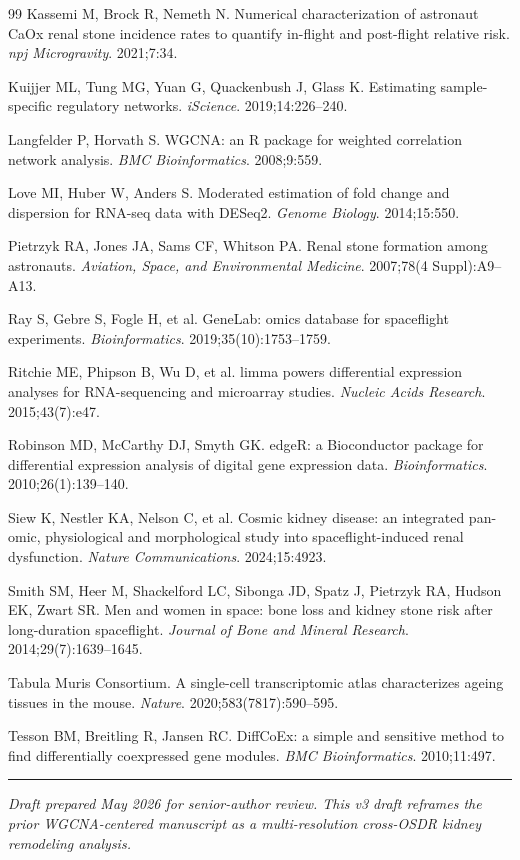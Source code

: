 \documentclass[11pt]{article}
\begin{document}
\begin{thebibliography}{99}
 Kassemi M, Brock R, Nemeth N. Numerical characterization of astronaut CaOx renal stone incidence rates to quantify in-flight and post-flight relative risk. \emph{npj Microgravity}. 2021;7:34.

 Kuijjer ML, Tung MG, Yuan G, Quackenbush J, Glass K. Estimating sample-specific regulatory networks. \emph{iScience}. 2019;14:226--240.

 Langfelder P, Horvath S. WGCNA: an R package for weighted correlation network analysis. \emph{BMC Bioinformatics}. 2008;9:559.

 Love MI, Huber W, Anders S. Moderated estimation of fold change and dispersion for RNA-seq data with DESeq2. \emph{Genome Biology}. 2014;15:550.

 Pietrzyk RA, Jones JA, Sams CF, Whitson PA. Renal stone formation among astronauts. \emph{Aviation, Space, and Environmental Medicine}. 2007;78(4 Suppl):A9--A13.

 Ray S, Gebre S, Fogle H, et al. GeneLab: omics database for spaceflight experiments. \emph{Bioinformatics}. 2019;35(10):1753--1759.

 Ritchie ME, Phipson B, Wu D, et al. limma powers differential expression analyses for RNA-sequencing and microarray studies. \emph{Nucleic Acids Research}. 2015;43(7):e47.

 Robinson MD, McCarthy DJ, Smyth GK. edgeR: a Bioconductor package for differential expression analysis of digital gene expression data. \emph{Bioinformatics}. 2010;26(1):139--140.

 Siew K, Nestler KA, Nelson C, et al. Cosmic kidney disease: an integrated pan-omic, physiological and morphological study into spaceflight-induced renal dysfunction. \emph{Nature Communications}. 2024;15:4923.

 Smith SM, Heer M, Shackelford LC, Sibonga JD, Spatz J, Pietrzyk RA, Hudson EK, Zwart SR. Men and women in space: bone loss and kidney stone risk after long-duration spaceflight. \emph{Journal of Bone and Mineral Research}. 2014;29(7):1639--1645.

 Tabula Muris Consortium. A single-cell transcriptomic atlas characterizes ageing tissues in the mouse. \emph{Nature}. 2020;583(7817):590--595.

 Tesson BM, Breitling R, Jansen RC. DiffCoEx: a simple and sensitive method to find differentially coexpressed gene modules. \emph{BMC Bioinformatics}. 2010;11:497.

\end{thebibliography}

\vspace{1em}
\begin{center}
\rule{0.4\textwidth}{0.4pt}
\end{center}
\vspace{0.3em}
\noindent\textit{Draft prepared May 2026 for senior-author review. This v3 draft reframes the prior WGCNA-centered manuscript as a multi-resolution cross-OSDR kidney remodeling analysis.}
\end{document}
